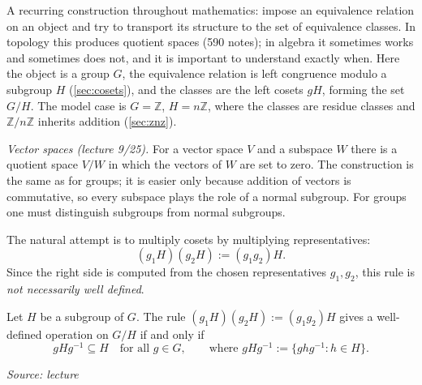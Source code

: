 \documentclass[11pt]{report}
\newcommand{\srcline}[1]{\par\hfill{\footnotesize\textit{Source: #1}}}
\begin{document}
\begin{rembox}\label{rem:motivation-quotients}
A recurring construction throughout mathematics: impose an equivalence relation on an object and try to transport its structure to the set of equivalence classes. In topology this produces quotient spaces (590 notes); in algebra it sometimes works and sometimes does not, and it is important to understand exactly when. Here the object is a group $G$, the equivalence relation is left congruence modulo a subgroup $H$ (\ref{sec:cosets}), and the classes are the left cosets $gH$, forming the set $G/H$. The model case is $G = \mathbb{Z}$, $H = n\mathbb{Z}$, where the classes are residue classes and $\mathbb{Z}/n\mathbb{Z}$ inherits addition (\ref{sec:znz}).

\emph{Vector spaces (lecture 9/25).} For a vector space $V$ and a subspace $W$ there is a quotient space $V/W$ in which the vectors of $W$ are set to zero. The construction is the same as for groups; it is easier only because addition of vectors is commutative, so every subspace plays the role of a normal subgroup. For groups one must distinguish subgroups from normal subgroups.
\end{rembox}

The natural attempt is to multiply cosets by multiplying representatives:
\[ (g_1H)(g_2H) := (g_1g_2)H. \]
Since the right side is computed from the chosen representatives $g_1, g_2$, this rule is \emph{not necessarily well defined}.

\begin{propbox}\label{prop:when-coset-multiplication-well-defined}
Let $H$ be a subgroup of $G$. The rule $(g_1H)(g_2H) := (g_1g_2)H$ gives a well-defined operation on $G/H$ if and only if
\[ gHg^{-1} \subseteq H \quad \text{for all } g \in G, \qquad \text{where } gHg^{-1} := \{ghg^{-1} : h \in H\}. \]
\srcline{lecture}
\end{propbox}
\end{document}

